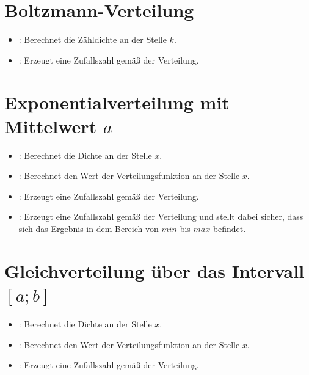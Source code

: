 \section{Boltzmann-Verteilung}

\begin{itemize}

\item
{}:
Berechnet die Zähldichte an der Stelle $k$.


\item
{}:
Erzeugt eine Zufallszahl gemäß der Verteilung.

\end{itemize}



\section{Exponentialverteilung mit Mittelwert \texorpdfstring{$a$}{a}}

\begin{itemize}

\item
{}:
Berechnet die Dichte an der Stelle $x$.

\item
{}:
Berechnet den Wert der Verteilungsfunktion an der Stelle $x$.

\item
{}:
Erzeugt eine Zufallszahl gemäß der Verteilung.

\item
{}:
Erzeugt eine Zufallszahl gemäß der Verteilung und stellt dabei sicher, dass sich das Ergebnis in dem Bereich von $min$ bis $max$ befindet.

\end{itemize}



\section{Gleichverteilung über das Intervall \texorpdfstring{$[a;b]$}{[a;b]}}

\begin{itemize}

\item
{}:
Berechnet die Dichte an der Stelle $x$.

\item
{}:
Berechnet den Wert der Verteilungsfunktion an der Stelle $x$.

\item
{}:
Erzeugt eine Zufallszahl gemäß der Verteilung.

\end{itemize}



